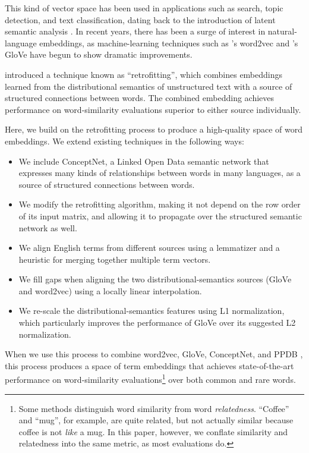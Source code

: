\documentclass[11pt,letterpaper]{article}
\begin{document}
This kind of vector space has
been used in applications such as search, topic detection, and text
classification, dating back to the introduction of latent semantic analysis
\cite{deerwester1990indexing}.  In recent years, there has been a surge of
interest in natural-language embeddings, as machine-learning techniques such as
's word2vec and 's
GloVe have begun to show dramatic improvements.

 introduced a technique
known as ``retrofitting'', which combines embeddings learned from the
distributional semantics of unstructured text with a source of structured
connections between words. The combined embedding achieves performance on
word-similarity evaluations superior to either source individually.

Here, we build on the retrofitting process to produce a high-quality space of
word embeddings. We extend existing techniques in the following ways:

\begin{itemize}
\item We include ConceptNet, a Linked Open Data semantic network that expresses
many kinds of relationships between words in many languages, as a source of
structured connections between words.
\item We modify the retrofitting algorithm, making it not depend on the row
order of its input matrix, and allowing it to propagate over the structured
semantic network as well.
\item We align English terms from different sources using a lemmatizer and a
heuristic for merging together multiple term vectors.
\item We fill gaps when aligning the two distributional-semantics sources
(GloVe and word2vec) using a locally linear interpolation.
\item We re-scale the distributional-semantics features using L1 normalization,
which particularly improves the performance of GloVe over its suggested L2
normalization.
\end{itemize}

When we use this process to combine word2vec, GloVe, ConceptNet, and PPDB
\cite{ganitkevitch2013ppdb}, this process produces a space of term embeddings
that achieves state-of-the-art performance on word-similarity
evaluations\footnote{Some methods distinguish word similarity from word
{\em relatedness}. ``Coffee'' and ``mug'', for example, are quite related,
but not actually similar because coffee is not {\em like} a mug. In this paper,
however, we conflate similarity and relatedness into the same metric, as most
evaluations do.}
over both common and rare words.
\end{document}
